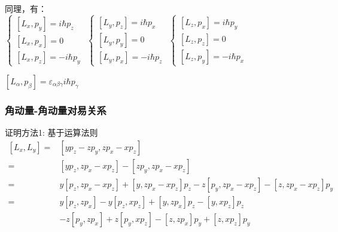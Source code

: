 \begin{frame}   
    同理，有：\\
    $\begin{cases}
        [L_x,p_y]= i\hbar p_z  \\ 
        [L_x,p_x]= 0  \\ 
        [L_x,p_z]= -i\hbar p_y 
    \end{cases}$
    $\begin{cases}
        [L_y,p_z]= i\hbar p_x  \\ 
        [L_y,p_y]= 0  \\ 
        [L_y,p_x]= -i\hbar p_z 
    \end{cases}$
    $\begin{cases}
        [L_z,p_x]= i\hbar p_y  \\ 
        [L_z,p_z]= 0  \\ 
        [L_z,p_y]= -i\hbar p_x 
    \end{cases}$
    \begin{tcolorbox4}
        $ [L_\alpha,p_\beta]= \varepsilon_{\alpha\beta\gamma} i\hbar p_\gamma $
    \end{tcolorbox4}
\end{frame} 

\begin{frame} 
    \frametitle{角动量-角动量对易关系}
    \alert{证明方法1:} 基于运算法则 
    \begin{equation*}
        \begin{split}
        [L_x,L_y]= &[yp_z-zp_y,zp_x-xp_z]\\
        =&[yp_z,zp_x-xp_z] - [zp_y,zp_x-xp_z]\\
        =&y[p_z,zp_x-xp_z]+[y,zp_x-xp_z]p_z- z[p_y,zp_x-xp_z]-[z,zp_x-xp_z]p_y\\
        =&y[p_z,zp_x]-y[p_z,xp_z]+[y,zp_x]p_z-[y,xp_z]p_z \\ &-z[p_y,zp_x] +z[p_y,xp_z]- [z,zp_x]p_y+[z,xp_z]p_y\\    
    \end{split}  
    \end{equation*}
\end{frame} 

